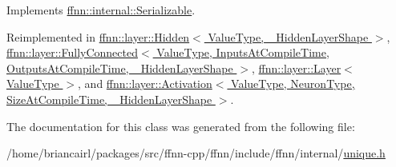 Implements \hyperlink{classffnn_1_1internal_1_1_serializable_a98b43aa17c4986e8a1b809b9d64796bb}{ffnn\-::internal\-::\-Serializable}.



Reimplemented in \hyperlink{classffnn_1_1layer_1_1_hidden_a1ef2b7dc49a809498125190628e672cf}{ffnn\-::layer\-::\-Hidden$<$ Value\-Type, \-\_\-\-Hidden\-Layer\-Shape $>$}, \hyperlink{classffnn_1_1layer_1_1_fully_connected_a7c79eb99c638b61f76ea34b725c0aeef}{ffnn\-::layer\-::\-Fully\-Connected$<$ Value\-Type, Inputs\-At\-Compile\-Time, Outputs\-At\-Compile\-Time, \-\_\-\-Hidden\-Layer\-Shape $>$}, \hyperlink{classffnn_1_1layer_1_1_layer_ac265fc929a178b111337226dd1cb62b6}{ffnn\-::layer\-::\-Layer$<$ Value\-Type $>$}, and \hyperlink{classffnn_1_1layer_1_1_activation_af4fa0c4e44033921fe6ada1dcd0c0560}{ffnn\-::layer\-::\-Activation$<$ Value\-Type, Neuron\-Type, Size\-At\-Compile\-Time, \-\_\-\-Hidden\-Layer\-Shape $>$}.



The documentation for this class was generated from the following file\-:\begin{DoxyCompactItemize}
\item 
/home/briancairl/packages/src/ffnn-\/cpp/ffnn/include/ffnn/internal/\hyperlink{unique_8h}{unique.\-h}\end{DoxyCompactItemize}

